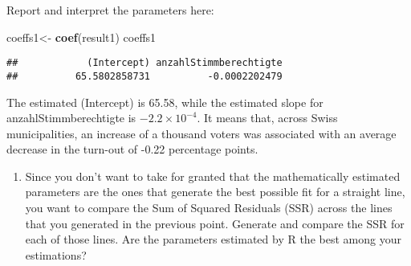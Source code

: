 \documentclass[
]{book}
\newenvironment{Shaded}{\begin{snugshade}}{\end{snugshade}}
\newcommand{\FunctionTok}[1]{\textcolor[rgb]{0.13,0.29,0.53}{\textbf{#1}}}
\newcommand{\NormalTok}[1]{#1}
\newcommand{\OtherTok}[1]{\textcolor[rgb]{0.56,0.35,0.01}{#1}}
\providecommand{\tightlist}{%
  \setlength{\itemsep}{0pt}\setlength{\parskip}{0pt}}
\begin{document}
Report and interpret the parameters here:

\begin{Shaded}
\begin{Highlighting}[]
\NormalTok{coeffs1}\OtherTok{\textless{}{-}} \FunctionTok{coef}\NormalTok{(result1)}
\NormalTok{coeffs1}
\end{Highlighting}
\end{Shaded}

\begin{verbatim}
##            (Intercept) anzahlStimmberechtigte 
##          65.5802858731          -0.0002202479
\end{verbatim}

The estimated (Intercept) is 65.58, while the estimated slope for anzahlStimmberechtigte is \ensuremath{-2.2\times 10^{-4}}. It means that, across Swiss municipalities, an increase of a thousand voters was associated with an average decrease in the turn-out of -0.22 percentage points.

\begin{enumerate}
\def\labelenumi{\roman{enumi}.}
\setcounter{enumi}{3}
\tightlist
\item
  Since you don't want to take for granted that the mathematically estimated parameters are the ones that generate the best possible fit for a straight line, you want to compare the Sum of Squared Residuals (SSR) across the lines that you generated in the previous point. Generate and compare the SSR for each of those lines. Are the parameters estimated by R the best among your estimations?
\end{enumerate}
\end{document}
